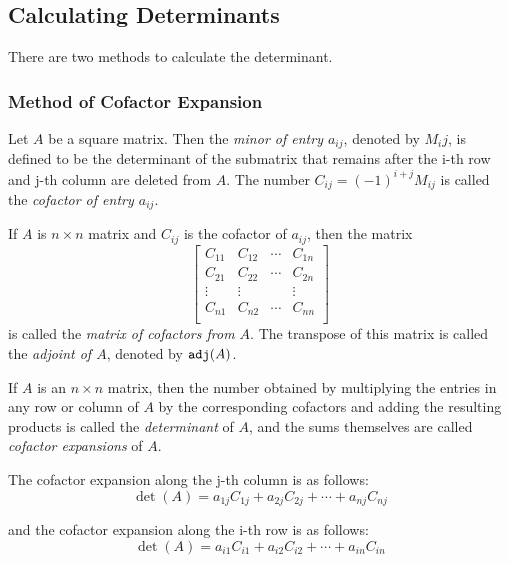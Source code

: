 \documentclass{report}
\begin{document}
		\subsection{Calculating Determinants}
			There are two methods to calculate the determinant.
			\subsubsection{Method of Cofactor Expansion}
				\begin{defn}
					Let $A$ be a square matrix. Then the \emph{minor of entry $a_{ij}$}, denoted by $M_ij$, is defined to be the determinant of the submatrix that remains after the i-th row and j-th column are deleted from $A$. The number $C_{ij}=(-1)^{i+j}M_{ij}$ is called the \emph{cofactor of entry $a_{ij}$}.
				\end{defn}
				
				\begin{defn}[Adjoint]
					If $A$ is $n \times n$ matrix and $C_{ij}$ is the cofactor of $a_{ij}$, then the matrix
					\begin{displaymath}
					\begin{bmatrix}
						C_{11} & C_{12} & \cdots & C_{1n} \\
						C_{21} & C_{22} & \cdots & C_{2n} \\
						\vdots & \vdots &        & \vdots \\
						C_{n1} & C_{n2} & \cdots & C_{nn} \\
					\end{bmatrix}
					\end{displaymath}
					is called the \emph{matrix of cofactors from $A$}. The transpose of this matrix is called the \emph{adjoint of $A$}, denoted by $\verb|adj|(A)$.
				\end{defn}
				
				\begin{defn}[Determinant]
					If $A$ is an $n \times n$ matrix, then the number obtained by multiplying the entries in any row or column of $A$ by the corresponding cofactors and adding the resulting products is called the \emph{determinant} of $A$, and the sums themselves are called \emph{cofactor expansions} of $A$.
					
					The cofactor expansion along the j-th column is as follows:
					\begin{displaymath}
						\det(A)=a_{1j}C_{1j}+a_{2j}C_{2j}+\cdots+a_{nj}C_{nj}
					\end{displaymath}
					
					and the cofactor expansion along the i-th row is as follows:
					\begin{displaymath}
						\det(A)=a_{i1}C_{i1}+a_{i2}C_{i2}+\cdots+a_{in}C_{in}
					\end{displaymath}
				\end{defn}
				
\end{document}
